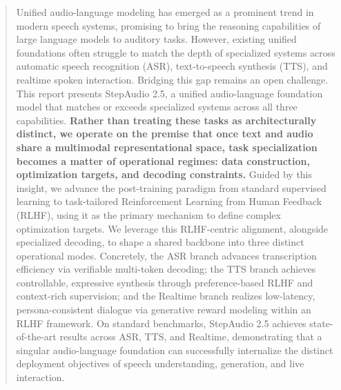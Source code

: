 \begin{abstract}
Unified audio-language modeling has emerged as a prominent trend in modern speech systems, promising to bring the reasoning capabilities of large language models to auditory tasks. However, existing unified foundations often struggle to match the depth of specialized systems across automatic speech recognition (ASR), text-to-speech synthesis (TTS), and realtime spoken interaction. Bridging this gap remains an open challenge. This report presents StepAudio 2.5, a unified audio-language foundation model that matches or exceeds specialized systems across all three capabilities. \textbf{Rather than treating these tasks as architecturally distinct, we operate on the premise that once text and audio share a multimodal representational space, task specialization becomes a matter of operational regimes: data construction, optimization targets, and decoding constraints.} Guided by this insight, we advance the post-training paradigm from standard supervised learning to task-tailored Reinforcement Learning from Human Feedback (RLHF), using it as the primary mechanism to define complex optimization targets. We leverage this RLHF-centric alignment, alongside specialized decoding, to shape a shared backbone into three distinct operational modes. Concretely, the ASR branch advances transcription efficiency via verifiable multi-token decoding; the TTS branch achieves controllable, expressive synthesis through preference-based RLHF and context-rich supervision; and the Realtime branch realizes low-latency, persona-consistent dialogue via generative reward modeling within an RLHF framework. On standard benchmarks, StepAudio 2.5 achieves state-of-the-art results across ASR, TTS, and Realtime, demonstrating that a singular audio-language foundation can successfully internalize the distinct deployment objectives of speech understanding, generation, and live interaction.


\end{abstract}